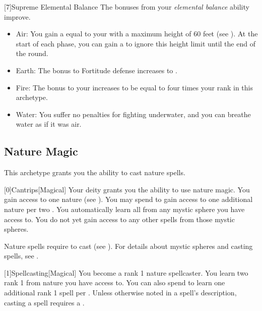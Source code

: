         [7]{Supreme Elemental Balance} The bonuses from your \textit{elemental balance} ability improve.
        \begin{itemize}
            \item Air: You gain a  equal to your  with a maximum height of 60 feet (see ).
            At the start of each phase, you can gain a  to ignore this height limit until the end of the round.
            \item Earth: The bonus to Fortitude defense increases to .
            \item Fire: The bonus to your  increases to be equal to four times your rank in this archetype.
            \item Water: You suffer no penalties for fighting underwater, and you can breathe water as if it was air.
        \end{itemize}

    \newpage
    \subsection{Nature Magic}
        This archetype grants you the ability to cast nature spells.

        [0]{Cantrips}[Magical]
        Your deity grants you the ability to use nature magic.
        You gain access to one nature  (see ).
        You may spend  to gain access to one additional nature  per two .
        You automatically learn all  from any mystic sphere you have access to.
        You do not yet gain access to any other spells from those mystic spheres.

        Nature spells require  to cast (see ).
        For details about mystic spheres and casting spells, see .

        [1]{Spellcasting}[Magical]
        You become a rank 1 nature spellcaster.
        You learn two rank 1  from nature  you have access to.
        You can also spend  to learn one additional rank 1 spell per .
        Unless otherwise noted in a spell's description, casting a spell requires a .

